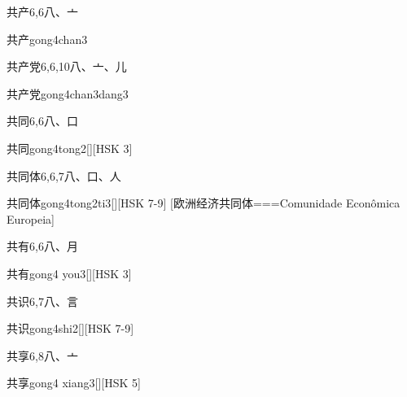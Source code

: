 \begin{Entry}{共产}{6,6}{⼋、⼇}
  \begin{Phonetics}{共产}{gong4chan3}
  \end{Phonetics}
\end{Entry}

\begin{Entry}{共产党}{6,6,10}{⼋、⼇、⼉}
  \begin{Phonetics}{共产党}{gong4chan3dang3}
  \end{Phonetics}
\end{Entry}

\begin{Entry}{共同}{6,6}{⼋、⼝}
  \begin{Phonetics}{共同}{gong4tong2}[][HSK 3]
  \end{Phonetics}
\end{Entry}

\begin{Entry}{共同体}{6,6,7}{⼋、⼝、⼈}
  \begin{Phonetics}{共同体}{gong4tong2ti3}[][HSK 7-9]
    [欧洲经济共同体===Comunidade Econômica Europeia]
  \end{Phonetics}
\end{Entry}

\begin{Entry}{共有}{6,6}{⼋、⽉}
  \begin{Phonetics}{共有}{gong4 you3}[][HSK 3]
  \end{Phonetics}
\end{Entry}

\begin{Entry}{共识}{6,7}{⼋、⾔}
  \begin{Phonetics}{共识}{gong4shi2}[][HSK 7-9]
  \end{Phonetics}
\end{Entry}

\begin{Entry}{共享}{6,8}{⼋、⼇}
  \begin{Phonetics}{共享}{gong4 xiang3}[][HSK 5]
  \end{Phonetics}
\end{Entry}

